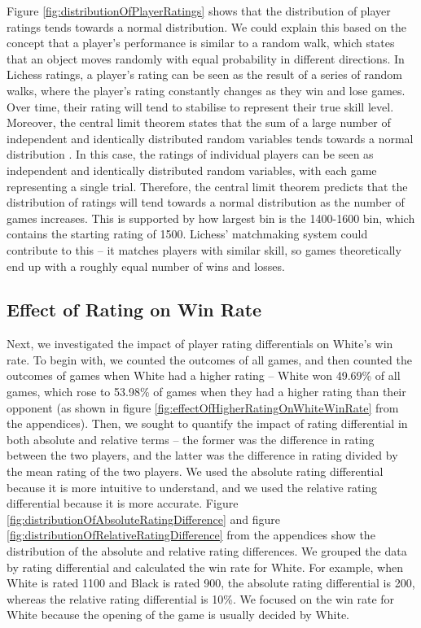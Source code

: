\documentclass[a4paper, 11pt]{article}
\begin{document}
Figure \ref{fig:distributionOfPlayerRatings} shows that the distribution of player ratings tends towards a normal distribution. We could explain this based on the concept that a player's performance is similar to a random walk, which states that an object moves randomly with equal probability in different directions. In Lichess ratings, a player's rating can be seen as the result of a series of random walks, where the player's rating constantly changes as they win and lose games. Over time, their rating will tend to stabilise to represent their true skill level. Moreover, the central limit theorem states that the sum of a large number of independent and identically distributed random variables tends towards a normal distribution \cite{le1986central}. In this case, the ratings of individual players can be seen as independent and identically distributed random variables, with each game representing a single trial. Therefore, the central limit theorem predicts that the distribution of ratings will tend towards a normal distribution as the number of games increases. This is supported by how largest bin is the 1400-1600 bin, which contains the starting rating of 1500. Lichess' matchmaking system could contribute to this -- it matches players with similar skill, so games theoretically end up with a roughly equal number of wins and losses.

\subsection{Effect of Rating on Win Rate}
Next, we investigated the impact of player rating differentials on White's win rate. To begin with, we counted the outcomes of all games, and then counted the outcomes of games when White had a higher rating -- White won 49.69\% of all games, which rose to 53.98\% of games when they had a higher rating than their opponent (as shown in figure \ref{fig:effectOfHigherRatingOnWhiteWinRate} from the appendices). Then, we sought to quantify the impact of rating differential in both absolute and relative terms -- the former was the difference in rating between the two players, and the latter was the difference in rating divided by the mean rating of the two players. We used the absolute rating differential because it is more intuitive to understand, and we used the relative rating differential because it is more accurate. Figure \ref{fig:distributionOfAbsoluteRatingDifference} and figure \ref{fig:distributionOfRelativeRatingDifference} from the appendices show the distribution of the absolute and relative rating differences. We grouped the data by rating differential and calculated the win rate for White. For example, when White is rated 1100 and Black is rated 900, the absolute rating differential is 200, whereas the relative rating differential is 10\%. We focused on the win rate for White because the opening of the game is usually decided by White.
\end{document}
